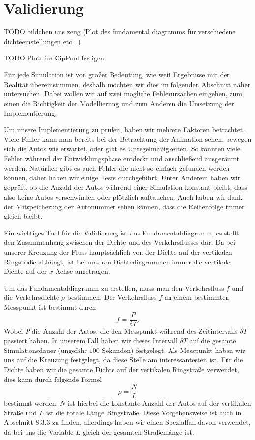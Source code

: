 \chapter{Validierung}
TODO bildchen uns zeug (Plot des fundamental diagramms für
verschiedene dichteeinstellungen etc...)

TODO Plots im CipPool fertigen 

Für jede Simulation ist von großer Bedeutung, wie weit Ergebnisse mit der Realität übereinstimmen, deshalb möchten wir dies im folgenden Abschnitt näher untersuchen. Dabei wollen wir auf zwei mögliche Fehlerursachen eingehen, zum einen die Richtigkeit der Modellierung und zum Anderen die Umsetzung der Implementierung. 

Um unsere Implementierung zu prüfen, haben wir mehrere Faktoren betrachtet. Viele Fehler kann man bereits bei der Betrachtung der Animation sehen, bewegen sich die Autos wie erwartet, oder gibt es Unregelmäßigkeiten. So konnten viele Fehler während der Entwicklungsphase entdeckt und anschließend ausgeräumt werden. Natürlich gibt es auch Fehler die nicht so einfach gefunden werden können, daher haben wir einige Tests durchgeführt. Unter Anderem haben wir geprüft, ob die Anzahl der Autos während einer Simulation konstant bleibt, dass also keine Autos verschwinden oder plötzlich auftauchen. Auch haben wir dank der Mitspeicherung der Autonummer sehen können, dass die Reihenfolge immer gleich bleibt. 

Ein wichtiges Tool für die Validierung ist das Fundamentaldiagramm, es stellt den Zusammenhang zwischen der Dichte und des Verkehrsflusses dar. Da bei unserer Kreuzung der Fluss hauptsächlich von der Dichte auf der vertikalen Ringstraße abhängt, ist bei unseren Dichtediagrammen immer die vertikale Dichte auf der $x$-Achse angetragen. 

Um das Fundamentaldiagramm zu erstellen, muss man den Verkehrsfluss $f$ und die Verkehrsdichte $\rho$ bestimmen. Der Verkehrsfluss $f$ an einem bestimmten Messpunkt ist bestimmt durch
\[ f = \frac{P}{\delta T}. \]
Wobei $P$ die Anzahl der Autos, die den Messpunkt während des Zeitintervalls $\delta T$ passiert haben. In unserem Fall haben wir dieses Intervall $\delta T$ auf die gesamte Simulationsdauer (ungefähr $100$ Sekunden) festgelegt. Als Messpunkt haben wir uns auf die Kreuzung festgelegt, da diese Stelle am interessantesten ist. Für die Dichte haben wir die gesamte Dichte auf der vertikalen Ringstraße verwendet, dies kann durch folgende Formel
\[ \rho = \frac{N}{L} \]
bestimmt werden. $N$ ist hierbei die konstante Anzahl der Autos auf der vertikalen Straße und $L$ ist die totale Länge Ringstraße. Diese Vorgehensweise ist auch in \cite{book:bungartz} Abschnitt 8.3.3 zu finden, allerdings haben wir einen Spezialfall davon verwendet, da bei uns die Variable $L$ gleich der gesamten Straßenlänge ist.

